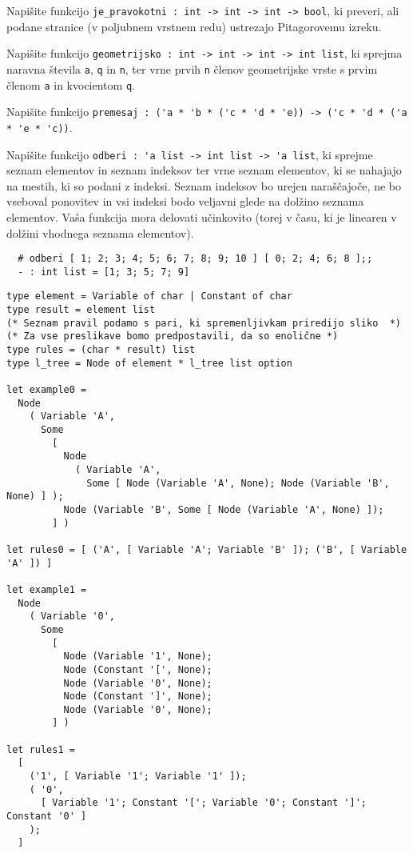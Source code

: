 \documentclass[arhiv]{../izpit}
\begin{document}


\naloga

\podnaloga
Napišite funkcijo \verb|je_pravokotni : int -> int -> int -> bool|, ki preveri, ali podane stranice (v poljubnem vrstnem redu) ustrezajo Pitagorovemu izreku.

\podnaloga
Napišite funkcijo \verb|geometrijsko : int -> int -> int -> int list|, ki sprejma naravna števila \verb|a|, \verb|q| in \verb|n|, ter vrne prvih \verb|n| členov geometrijske vrste s prvim členom \verb|a| in kvocientom \verb|q|.

\podnaloga
Napišite funkcijo \verb|premesaj : ('a * 'b * ('c * 'd * 'e)) -> ('c * 'd * ('a * 'e * 'c))|.

\podnaloga
Napišite funkcijo \verb|odberi : 'a list -> int list -> 'a list|, ki sprejme seznam elementov in seznam indeksov ter vrne seznam elementov, ki se nahajajo na mestih, ki so podani z indeksi.
Seznam indeksov bo urejen naraščajoče, ne bo vseboval ponovitev in vsi indeksi bodo veljavni glede na dolžino seznama elementov.
Vaša funkcija mora delovati učinkovito (torej v času, ki je linearen v dolžini vhodnega seznama elementov).

\begin{verbatim}
  # odberi [ 1; 2; 3; 4; 5; 6; 7; 8; 9; 10 ] [ 0; 2; 4; 6; 8 ];;
  - : int list = [1; 3; 5; 7; 9]
\end{verbatim}



\naloga

\begin{verbatim}
type element = Variable of char | Constant of char
type result = element list
(* Seznam pravil podamo s pari, ki spremenljivkam priredijo sliko  *)
(* Za vse preslikave bomo predpostavili, da so enolične *)
type rules = (char * result) list
type l_tree = Node of element * l_tree list option

let example0 =
  Node
    ( Variable 'A',
      Some
        [
          Node
            ( Variable 'A',
              Some [ Node (Variable 'A', None); Node (Variable 'B', None) ] );
          Node (Variable 'B', Some [ Node (Variable 'A', None) ]);
        ] )

let rules0 = [ ('A', [ Variable 'A'; Variable 'B' ]); ('B', [ Variable 'A' ]) ]

let example1 =
  Node
    ( Variable '0',
      Some
        [
          Node (Variable '1', None);
          Node (Constant '[', None);
          Node (Variable '0', None);
          Node (Constant ']', None);
          Node (Variable '0', None);
        ] )

let rules1 =
  [
    ('1', [ Variable '1'; Variable '1' ]);
    ( '0',
      [ Variable '1'; Constant '['; Variable '0'; Constant ']'; Constant '0' ]
    );
  ]
\end{verbatim}
\end{document}
